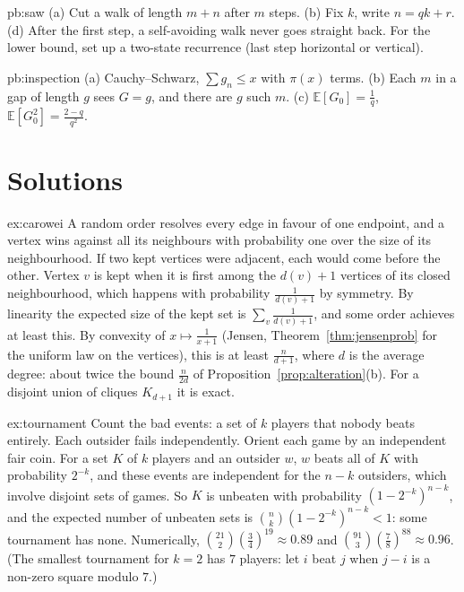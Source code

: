 \begin{hint}{pb:saw}
(a) Cut a walk of length $m+n$ after $m$ steps. (b) Fix $k$, write $n=qk+r$. (d) After the first step, a self-avoiding walk never goes straight back. For the lower bound, set up a
two-state recurrence (last step horizontal or vertical).
\end{hint}

\begin{hint}{pb:inspection}
(a) Cauchy--Schwarz, $\sum g_n\le x$ with $\pi(x)$ terms. (b) Each $m$ in a gap of length $g$ sees $G=g$, and there are $g$ such $m$. (c) $\mathbb E[G_0]=\frac1q$, $\mathbb E[G_0^2]=\frac{2-q}{q^2}$.
\end{hint}

\section{Solutions}

\begin{solution}{ex:carowei}
\idea A random order resolves every edge in favour of one endpoint, and a vertex wins against all its neighbours with
probability one over the size of its neighbourhood.
\writeup If two kept vertices were adjacent, each would come before the other. Vertex $v$ is kept when it is first among the $d(v)+1$
vertices of its closed neighbourhood, which happens with probability $\frac1{d(v)+1}$ by symmetry. By linearity the expected size of the kept set is
$\sum_v\frac1{d(v)+1}$, and some order achieves at least this. By convexity of $x\mapsto\frac1{x+1}$ (Jensen, Theorem~\ref{thm:jensenprob} for the uniform law on the vertices), this is at
least $\frac n{d+1}$, where $d$ is the average degree: about twice the bound $\frac n{2d}$ of Proposition~\ref{prop:alteration}(b). For a disjoint union of cliques $K_{d+1}$ it is exact.
\end{solution}

\begin{solution}{ex:tournament}
\idea Count the bad events: a set of $k$ players that nobody beats entirely. Each outsider fails independently.
\writeup Orient each game by an independent fair coin. For a set $K$ of $k$ players and an outsider $w$, $w$ beats all of $K$ with probability $2^{-k}$, and
these events are independent for the $n-k$ outsiders, which involve disjoint sets of games. So $K$ is unbeaten with probability $(1-2^{-k})^{n-k}$,
and the expected number of unbeaten sets is $\binom nk(1-2^{-k})^{n-k}<1$: some tournament has none. Numerically, $\binom{21}2(\frac34)^{19}\approx0.89$ and $\binom{91}3(\frac78)^{88}\approx0.96$. (The smallest
tournament for $k=2$ has $7$ players: let $i$ beat $j$ when $j-i$ is a non-zero square modulo $7$.)
\end{solution}

